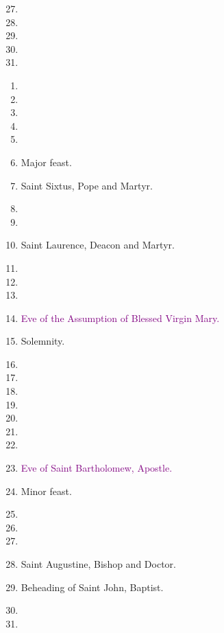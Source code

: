 		\begin{enumerate}
			\setcounter{enumi}{26}
			\item %
			\item %
			\item %
			\item %
			\item %
		\end{enumerate}
	
	\pagebreak[1]
	
		\begin{enumerate}
			\item %
			\item %
			\item %
			\item %
			\item %
			\item {} Major feast.
			\item Saint Sixtus, Pope and Martyr. 
			\item %
			\item %
			\item Saint Laurence, Deacon and Martyr. 
			\item %
			\item %
			\item %
			\item \textcolor{purple}{Eve of the Assumption of Blessed Virgin Mary.}
			\item {} Solemnity.
			\item %
			\item %
			\item %
			\item %
			\item %
			\item %
			\item %
			\item \textcolor{purple}{Eve of Saint Bartholomew, Apostle.}
			\item {} Minor feast.
			\item %
			\item %
			\item %
			\item Saint Augustine, Bishop and Doctor. 
			\item Beheading of Saint John, Baptist. 
			\item %
			\item %
		\end{enumerate}
	
